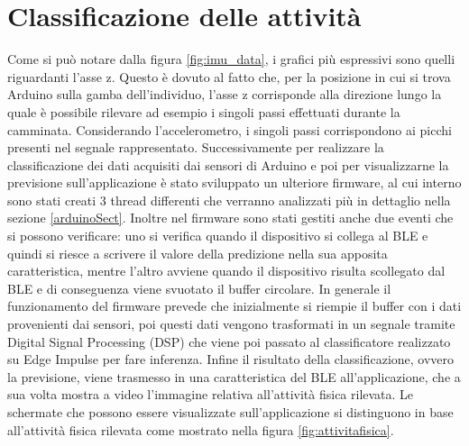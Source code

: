 \section{Classificazione delle attività} \label{classifSect}
Come si può notare dalla figura \ref{fig:imu_data}, i grafici più espressivi sono quelli riguardanti l'asse z. Questo è dovuto al fatto che, per la posizione in cui si trova Arduino sulla gamba dell'individuo, l'asse z corrisponde alla direzione lungo la quale è possibile rilevare ad esempio i singoli passi effettuati durante la camminata. Considerando l'accelerometro, i singoli passi corrispondono ai picchi presenti nel segnale rappresentato.
Successivamente per realizzare la classificazione dei dati acquisiti dai sensori di Arduino e poi per visualizzarne la previsione sull'applicazione è stato sviluppato un ulteriore firmware, al cui interno sono stati creati 3 thread differenti che verranno analizzati più in dettaglio nella sezione \ref{arduinoSect}. Inoltre nel firmware sono stati gestiti anche due eventi che si possono verificare: uno si verifica quando il dispositivo si collega al BLE e quindi si riesce a scrivere il valore della predizione nella sua apposita caratteristica, mentre l'altro avviene quando il dispositivo risulta scollegato dal BLE e di conseguenza viene svuotato il buffer circolare.
In generale il funzionamento del firmware prevede che inizialmente si riempie il buffer con i dati provenienti dai sensori, poi questi dati vengono trasformati in un segnale tramite Digital Signal Processing (DSP) che viene poi passato al classificatore realizzato su Edge Impulse per fare inferenza.
Infine il risultato della classificazione, ovvero la previsione, viene trasmesso in una caratteristica del BLE all'applicazione, che a sua volta mostra a video l'immagine relativa all'attività fisica rilevata. Le schermate che possono essere visualizzate sull'applicazione si distinguono in base all'attività fisica rilevata come mostrato nella figura \ref{fig:attivitafisica}.
